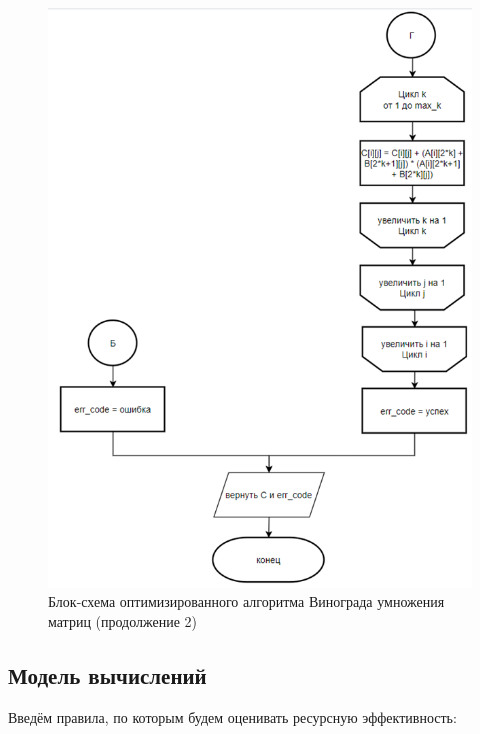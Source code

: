 \begin{figure}[H]
    \centering
    \includegraphics[width=1.02\textwidth]{img/block_3_3.png}
    \caption{Блок-схема оптимизированного алгоритма Винограда умножения матриц (продолжение 2)}
    \label{fig:block_3_3}
\end{figure}

\subsection{Модель вычислений}

\hspace{1.25cm}
Введём правила, по которым будем оценивать ресурсную эффективность:


